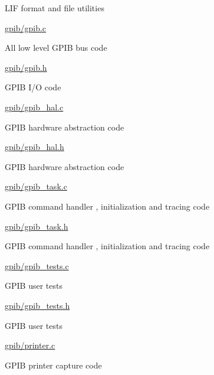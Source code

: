 \begin{DoxyPre}
\begin{DoxyItemize}
\begin{DoxyItemize}
\begin{DoxyItemize}
\item LIF format and file utilities
\end{DoxyItemize}
\item \hyperlink{gpib_8c}{gpib/gpib.c}
\begin{DoxyItemize}
\item All low level GPIB bus code
\end{DoxyItemize}
\item \hyperlink{gpib_8h}{gpib/gpib.h}
\begin{DoxyItemize}
\item GPIB I/O code
\end{DoxyItemize}
\item \hyperlink{gpib__hal_8c}{gpib/gpib\_hal.c}
\begin{DoxyItemize}
\item GPIB hardware abstraction code
\end{DoxyItemize}
\item \hyperlink{gpib__hal_8h}{gpib/gpib\_hal.h}
\begin{DoxyItemize}
\item GPIB hardware abstraction code
\end{DoxyItemize}
\item \hyperlink{gpib__task_8c}{gpib/gpib\_task.c}
\begin{DoxyItemize}
\item GPIB command handler , initialization and tracing code
\end{DoxyItemize}
\item \hyperlink{gpib__task_8h}{gpib/gpib\_task.h}
\begin{DoxyItemize}
\item GPIB command handler , initialization and tracing code
\end{DoxyItemize}
\item \hyperlink{gpib__tests_8c}{gpib/gpib\_tests.c}
\begin{DoxyItemize}
\item GPIB user tests
\end{DoxyItemize}
\item \hyperlink{gpib__tests_8h}{gpib/gpib\_tests.h}
\begin{DoxyItemize}
\item GPIB user tests
\end{DoxyItemize}
\item \hyperlink{printer_8c}{gpib/printer.c}
\begin{DoxyItemize}
\item GPIB printer capture code

\end{DoxyItemize}
\end{DoxyItemize}
\end{DoxyItemize}
\end{DoxyPre}
